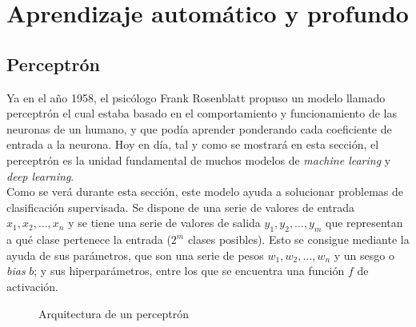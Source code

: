 \chapter{Aprendizaje automático y profundo}

	\section{Perceptrón}
	
		Ya en el año 1958, el psicólogo Frank Rosenblatt propuso un modelo llamado perceptrón el cual estaba basado en el comportamiento y funcionamiento de las neuronas de un humano, y que podía aprender ponderando cada coeficiente de entrada a la neurona\cite{historiaIA}. Hoy en día, tal y como se mostrará en esta sección, el perceptrón es la unidad fundamental de muchos modelos de \textit{machine learing} y \textit{deep learning}. \\
		
		Como se verá durante esta sección, este modelo ayuda a solucionar problemas de clasificación supervisada. Se dispone de una serie de valores de entrada $x_1, x_2, \hdots, x_n$ y se tiene una serie de valores de salida $y_1, y_2, \hdots, y_m$ que representan a qué clase pertenece la entrada ($2^m$ clases posibles). Esto se consigue mediante la ayuda de sus parámetros, que son una serie de pesos $w_1, w_2, \hdots, w_n$ y un sesgo o \textit{bias} $b$; y sus hiperparámetros, entre los que se encuentra una función $f$ de activación. 
		
		\begin{figure}[!h]
			\centering
			\caption{Arquitectura de un perceptrón}
			\label{fig:perceptron}
		\end{figure}
		

